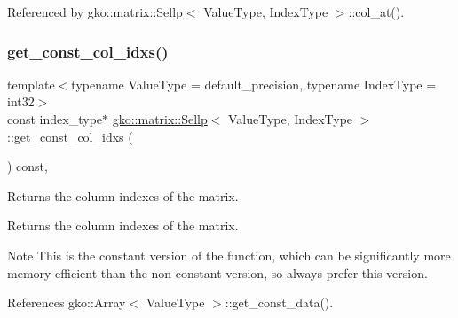 Referenced by gko\+::matrix\+::\+Sellp$<$ Value\+Type, Index\+Type $>$\+::col\+\_\+at().

\mbox{\label{classgko_1_1matrix_1_1Sellp_a6b5417bd6f2c876925ce732c7526b562}} 
\subsubsection{\texorpdfstring{get\+\_\+const\+\_\+col\+\_\+idxs()}{get\_const\_col\_idxs()}}
{\footnotesize\ttfamily template$<$typename Value\+Type = default\+\_\+precision, typename Index\+Type = int32$>$ \\
const index\+\_\+type$\ast$ \hyperlink{classgko_1_1matrix_1_1Sellp}{gko\+::matrix\+::\+Sellp}$<$ Value\+Type, Index\+Type $>$\+::get\+\_\+const\+\_\+col\+\_\+idxs (\begin{DoxyParamCaption}{ }\end{DoxyParamCaption}) const\hspace{0.3cm}{\ttfamily [inline]}, {\ttfamily [noexcept]}}



Returns the column indexes of the matrix. 

\begin{DoxyReturn}{Returns}
the column indexes of the matrix.
\end{DoxyReturn}
\begin{DoxyNote}{Note}
This is the constant version of the function, which can be significantly more memory efficient than the non-\/constant version, so always prefer this version. 
\end{DoxyNote}


References gko\+::\+Array$<$ Value\+Type $>$\+::get\+\_\+const\+\_\+data().

\mbox{\label{classgko_1_1matrix_1_1Sellp_adf13bb4a4f8660b4ae27fe2ae6a874aa}} 
